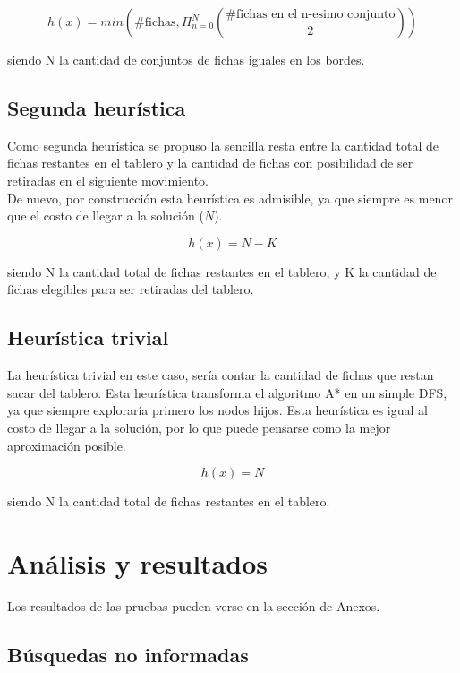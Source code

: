 \documentclass[a4paper,10pt]{article}
\begin{document}
    \[ h(x) = min(\text{\# fichas}, \Pi_{n=0}^{N} { \text{\# fichas en el n-esimo conjunto} \choose 2} )\] 

    siendo N la cantidad de conjuntos de fichas iguales en los bordes.
    
    \subsection{Segunda heurística}

    Como segunda heurística se propuso la sencilla resta entre la cantidad total de fichas restantes en el tablero y la cantidad de fichas con posibilidad de ser retiradas en el
    siguiente movimiento.\\

    De nuevo, por construcción esta heurística es admisible, ya que siempre es menor que el costo de llegar a la solución ($N$).

     \[ h(x) = N - K\] 

    siendo N la cantidad total de fichas restantes en el tablero, y K la cantidad de fichas elegibles para ser retiradas del tablero.

    \subsection{Heurística trivial}

    La heurística trivial en este caso, sería contar la cantidad de fichas que restan sacar del tablero. Esta heurística transforma el algoritmo A* en un simple DFS, 
    ya que siempre exploraría primero los nodos hijos. Esta heurística es igual al costo de llegar a la solución, por lo que puede pensarse como la mejor aproximación posible.

    \[ h(x) = N \] 

    siendo N la cantidad total de fichas restantes en el tablero.

\section{Análisis y resultados}


Los resultados de las pruebas pueden verse en la sección de Anexos.

\subsection{Búsquedas no informadas}
\end{document}
